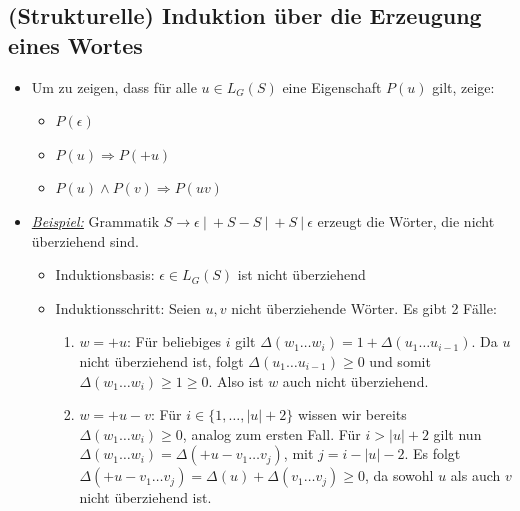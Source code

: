 \documentclass[ieeetran]{article}
\begin{document}
\subsection{(Strukturelle) Induktion über die Erzeugung eines Wortes} %
\label{sub:_strukturelle_induktion_über_die_erzeugung_von_einem_wort}
\begin{itemize}
  \item Um zu zeigen, dass für alle $u \in L_G(S)$ eine Eigenschaft $P(u)$ gilt, zeige:
\begin{itemize}
  \item $P(\epsilon)$
  \item $P(u) \Longrightarrow P(+u)$
\item $P(u) \land P(v) \Longrightarrow P(uv)$
\end{itemize}

\item \textit{\underline{Beispiel:}} Grammatik $S \rightarrow \epsilon \ | \ +S-S \ | \ +S \ | \ \epsilon$ erzeugt die Wörter, die nicht überziehend sind.
\begin{itemize}

\item Induktionsbasis: $\epsilon \in L_G(S)$ ist nicht überziehend
\item Induktionsschritt: Seien $u, v$ nicht überziehende Wörter. Es gibt 2 Fälle:
	\begin{enumerate}
		\item $w=+u$: Für beliebiges $i$ gilt $\Delta(w_1 \dots w_i) = 1 + \Delta(u_1 \ldots u_{i-1})$. Da $u$ nicht überziehend ist, folgt $\Delta(u_1 \ldots u_{i-1}) \ge 0$ und somit $\Delta(w_1 \ldots w_i) \ge 1 \ge 0$. Also ist $w$ auch nicht überziehend.
		\item $w=+u-v$: Für $i \in \{1, \ldots, |u|+2\}$ wissen wir bereits $\Delta(w_1 \ldots w_i) \ge 0$, analog zum ersten Fall. Für $i > |u| + 2$ gilt nun $\Delta(w_1 \ldots w_i) = \Delta(+u-v_1 \ldots v_j)$, mit $j = i - |u| - 2$. Es folgt $\Delta(+u-v_1 \ldots v_j) = \Delta(u) + \Delta(v_1 \ldots v_j) \ge 0$, da sowohl $u$ als auch $v$ nicht überziehend ist.
	\end{enumerate}


\end{itemize}


\end{itemize}
\end{document}
